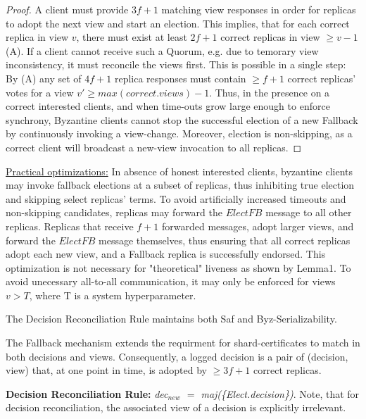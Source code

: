 \begin{proof}
A client must provide $3f+1$ matching view responses in order for replicas to adopt the next view and start an election. This implies, that for each correct replica in view $v$, there must exist at least $2f+1$ correct replicas in view $\geq v-1$ (A).
If a client cannot receive such a Quorum, e.g. due to temorary view inconsistency, it must reconcile the views first. This is possible in a single step: By (A) any set of $4f+1$ replica responses must contain $\geq f+1$ correct replicas' votes for a view $v' \geq max(correct.views) -1 $. 
Thus, in the presence on a correct interested clients, and when time-outs grow large enough to enforce synchrony, Byzantine clients cannot stop the successful election of a new Fallback by continuously invoking a view-change. Moreover, election is non-skipping, as a correct client will broadcast a new-view invocation to all replicas. 
\end{proof}

\underline{Practical optimizations:}  In absence of honest interested clients, byzantine clients may invoke fallback elections at a subset of replicas, thus inhibiting true election and skipping select replicas' terms. To avoid artificially increased timeouts and non-skipping candidates, replicas may forward the $ElectFB$ message to all other replicas. Replicas that receive $f+1$ forwarded messages, adopt larger views, and forward the $ElectFB$ message themselves, thus ensuring that all correct replicas adopt each new view, and a Fallback replica is successfully endorsed.
This optimization is not necessary for "theoretical" liveness as shown by Lemma1. To avoid unecessary all-to-all communication, it may only be enforced for views $v > T$, where T is a system hyperparameter.\\





\begin{lemma}
The Decision Reconciliation Rule maintains both Saf and Byz-Serializability.
\end{lemma}

The Fallback mechanism extends the requirment for shard-certificates to match in both decisions and views. Consequently, a logged decision is a pair of (decision, view) that, at one point in time, is adopted by $\geq 3f+1$  correct replicas.

\textbf{Decision Reconciliation Rule:} \textit{dec$_{new}$ $=$ maj(\{Elect.decision\})}. Note, that for decision reconciliation, the associated view of a decision is explicitly irrelevant.

